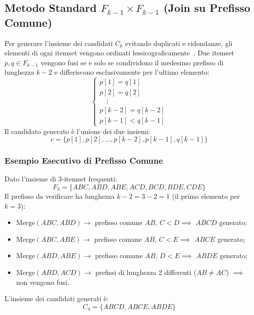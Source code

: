 \subsection{Metodo Standard $F_{k-1} \times F_{k-1}$ (Join su Prefisso Comune)}
Per generare l'insieme dei candidati $C_k$ evitando duplicati e ridondanze, gli elementi di ogni itemset vengono ordinati lessicograficamente~\cite{agrawal1994}. Due itemset $p, q \in F_{k-1}$ vengono fusi se e solo se condividono il medesimo prefisso di lunghezza $k-2$ e differiscono esclusivamente per l'ultimo elemento:
\begin{equation}
\label{eq:dm-prefix-join-condition}
\begin{cases}
p[1] = q[1] \\
p[2] = q[2] \\
\quad \vdots \\
p[k-2] = q[k-2] \\
p[k-1] < q[k-1]
\end{cases}
\end{equation}
Il candidato generato è l'unione dei due insiemi:
\begin{equation}
c = \{p[1], p[2], \dots, p[k-2], p[k-1], q[k-1]\}
\end{equation}

\subsubsection{Esempio Esecutivo di Prefisso Comune}
Dato l'insieme di 3-itemset frequenti:
\begin{equation}
F_3 = \{ABC, ABD, ABE, ACD, BCD, BDE, CDE\}
\end{equation}
Il prefisso da verificare ha lunghezza $k-2 = 3-2 = 1$ (il primo elemento per $k=3$):
\begin{itemize}[noitemsep]
    \item $\mathrm{Merge}(ABC, ABD) \rightarrow$ prefisso comune $AB$, $C < D \implies$ \textbf{$ABCD$} generato;
    \item $\mathrm{Merge}(ABC, ABE) \rightarrow$ prefisso comune $AB$, $C < E \implies$ \textbf{$ABCE$} generato;
    \item $\mathrm{Merge}(ABD, ABE) \rightarrow$ prefisso comune $AB$, $D < E \implies$ \textbf{$ABDE$} generato;
    \item $\mathrm{Merge}(ABD, ACD) \rightarrow$ prefissi di lunghezza 2 differenti ($AB \ne AC$) $\implies$ non vengono fusi.
\end{itemize}
L'insieme dei candidati generati è:
\begin{equation}
C_4 = \{ABCD, ABCE, ABDE\}
\end{equation}

